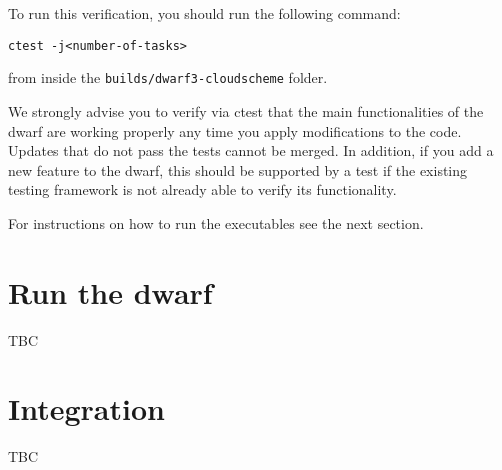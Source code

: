 \documentclass[
a4paper,     %
12pt,        %
article,
onecolumn,   %
openany,     %
]{memoir}
\newcommand{\inlsh}[1]{\texttt{#1}}
\newcommand{\inlsh}[1]{\tikz[anchor=base,baseline]\node[inner sep=2pt,
outer sep=0,draw=yellow!10,fill=yellow!10]{\texttt{#1}};}
\begin{document}
To run this verification, you should run the following 
command:
%
\begin{lstlisting}[style=BashStyle]
ctest -j<number-of-tasks>
\end{lstlisting}
%
from inside the \inlsh{builds/dwarf3-cloudscheme}
folder.
%
\begin{warningbox}
We strongly advise you to verify via ctest that 
the main functionalities of the dwarf are working 
properly any time you apply modifications to the 
code. Updates that do not pass the tests cannot 
be merged. 
In addition, if you add a new feature to the dwarf,
this should be supported by a test if the existing
testing framework is not already able to verify its
functionality.
\end{warningbox}
%
For instructions on how to run the executables 
see the next section.


\section{Run the dwarf}
TBC

 


\section{Integration}
TBC



\backmatter




\end{document}
